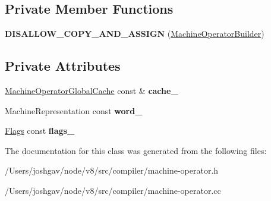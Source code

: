 \subsection*{Private Member Functions}
\begin{DoxyCompactItemize}
\item 
{\bfseries D\+I\+S\+A\+L\+L\+O\+W\+\_\+\+C\+O\+P\+Y\+\_\+\+A\+N\+D\+\_\+\+A\+S\+S\+I\+GN} (\hyperlink{classv8_1_1internal_1_1compiler_1_1_machine_operator_builder}{Machine\+Operator\+Builder})\hypertarget{classv8_1_1internal_1_1compiler_1_1_machine_operator_builder_a0d1dd8296436ddb2bd5d02399cc8fcac}{}\label{classv8_1_1internal_1_1compiler_1_1_machine_operator_builder_a0d1dd8296436ddb2bd5d02399cc8fcac}

\end{DoxyCompactItemize}
\subsection*{Private Attributes}
\begin{DoxyCompactItemize}
\item 
\hyperlink{structv8_1_1internal_1_1compiler_1_1_machine_operator_global_cache}{Machine\+Operator\+Global\+Cache} const \& {\bfseries cache\+\_\+}\hypertarget{classv8_1_1internal_1_1compiler_1_1_machine_operator_builder_ad781b6c8766561df305e84da7381a74a}{}\label{classv8_1_1internal_1_1compiler_1_1_machine_operator_builder_ad781b6c8766561df305e84da7381a74a}

\item 
Machine\+Representation const {\bfseries word\+\_\+}\hypertarget{classv8_1_1internal_1_1compiler_1_1_machine_operator_builder_aea64daede5d27a8089af6462b90aabfb}{}\label{classv8_1_1internal_1_1compiler_1_1_machine_operator_builder_aea64daede5d27a8089af6462b90aabfb}

\item 
\hyperlink{classv8_1_1base_1_1_flags}{Flags} const {\bfseries flags\+\_\+}\hypertarget{classv8_1_1internal_1_1compiler_1_1_machine_operator_builder_a9230ae9ab496c919cbf18b714dafd23c}{}\label{classv8_1_1internal_1_1compiler_1_1_machine_operator_builder_a9230ae9ab496c919cbf18b714dafd23c}

\end{DoxyCompactItemize}


The documentation for this class was generated from the following files\+:\begin{DoxyCompactItemize}
\item 
/\+Users/joshgav/node/v8/src/compiler/machine-\/operator.\+h\item 
/\+Users/joshgav/node/v8/src/compiler/machine-\/operator.\+cc\end{DoxyCompactItemize}
